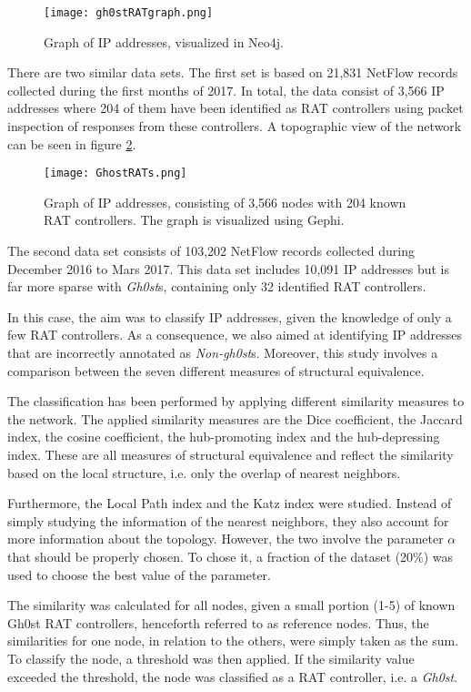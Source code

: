 \begin{figure}[h!]
    \centering
    \texttt{[image: gh0stRATgraph.png]}
    \caption{Graph of IP addresses, visualized in Neo4j.}
    \label{gh0stGraph}
\end{figure}

There are two similar data sets. The first set is based on 21,831 NetFlow records collected during the first months of 2017. In total, the data consist of 3,566 IP addresses where 204 of them have been identified as RAT controllers using packet inspection of responses from these controllers. A topographic view of the network can be seen in figure \ref{ip1}.

\begin{figure}[h!]
    \centering
    \texttt{[image: GhostRATs.png]}
    \caption{Graph of IP addresses, consisting of 3,566 nodes with 204 known RAT controllers. The graph is visualized using Gephi.}
    \label{ip1}
\end{figure}

The second data set consists of 103,202 NetFlow records collected during December 2016 to Mars 2017. This data set includes 10,091 IP addresses but is far more sparse with \textit{Gh0st}s, containing only 32 identified RAT controllers. 

In this case, the aim was to classify IP addresses, given the knowledge of only a few RAT controllers. As a consequence, we also aimed at identifying IP addresses that are incorrectly annotated as \textit{Non-gh0st}s. Moreover, this study involves a comparison between the seven different measures of structural equivalence. 

The classification has been performed by applying different similarity measures to the network. The applied similarity measures are the Dice coefficient, the Jaccard index, the cosine coefficient, the hub-promoting index and the hub-depressing index. These are all measures of structural equivalence and reflect the similarity based on the local structure, i.e. only the overlap of nearest neighbors.

Furthermore, the Local Path index and the Katz index were studied. Instead of simply studying the information of the nearest neighbors, they also account for more information about the topology. However, the two involve the parameter $\alpha$ that should be properly chosen. To chose it, a fraction of the dataset (20\%) was used to choose the best value of the parameter. 

The similarity was calculated for all nodes, given a small portion (1-5) of known Gh0st RAT controllers, henceforth referred to as reference nodes. Thus, the similarities for one node, in relation to the others, were simply taken as the sum. To classify the node, a threshold was then applied. If the similarity value exceeded the threshold, the node was classified as a RAT controller, i.e. a \textit{Gh0st}.

